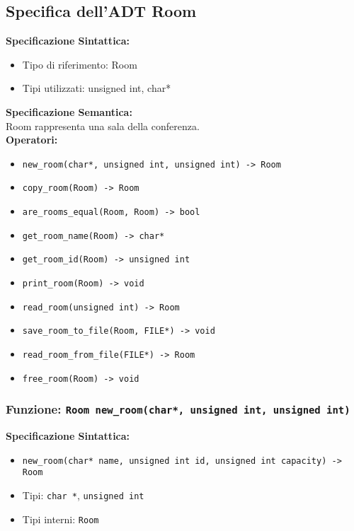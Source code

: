 \documentclass[11pt]{scrartcl} %
\begin{document}
\subsection{Specifica dell'ADT Room}

\textbf{Specificazione Sintattica:}
\begin{itemize}
	\item Tipo di riferimento: Room
	\item Tipi utilizzati: unsigned int, char*
\end{itemize}
\textbf{Specificazione Semantica:} \\
Room rappresenta una sala della conferenza.\\

\textbf{Operatori:} \\
\begin{itemize}
    \item \texttt{new\_room(char*, unsigned int, unsigned int) -> Room}
    \item \texttt{copy\_room(Room) -> Room}
    \item \texttt{are\_rooms\_equal(Room, Room) -> bool}
    \item \texttt{get\_room\_name(Room) ->  char*}
    \item \texttt{get\_room\_id(Room) -> unsigned int}
    \item \texttt{print\_room(Room) -> void}
    \item \texttt{read\_room(unsigned int) -> Room}
    \item \texttt{save\_room\_to\_file(Room, FILE*) -> void}
    \item \texttt{read\_room\_from\_file(FILE*) -> Room}
    \item \texttt{free\_room(Room) -> void}
\end{itemize}



\subsubsection{Funzione: \texttt{Room new\_room(char*, unsigned int, unsigned int)}}

\textbf{Specificazione Sintattica:}
\begin{itemize}
	\item \texttt{new\_room(char* name, unsigned int id, unsigned int capacity) -> Room}
	\item Tipi: \texttt{char *}, \texttt{unsigned int}
	\item Tipi interni: \texttt{Room}
\end{itemize}
\end{document}
